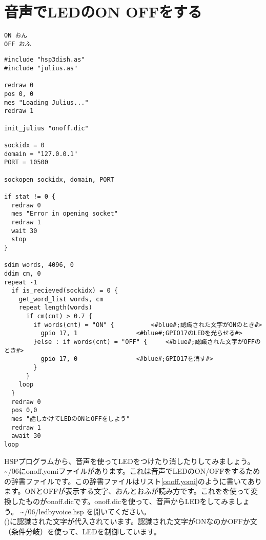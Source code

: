 \newpage
\section{音声でLEDのON OFFをする}

\begin{lstlisting}[caption=onoff.yomi,label=onoff.yomi]
ON おん
OFF おふ
\end{lstlisting}

\begin{lstlisting}[caption=ledbyvoice.hsp,label=ledbyvoice.hsp]
#include "hsp3dish.as"
#include "julius.as"

redraw 0
pos 0, 0
mes "Loading Julius..."
redraw 1

init_julius "onoff.dic"

sockidx = 0
domain = "127.0.0.1"
PORT = 10500

sockopen sockidx, domain, PORT

if stat != 0 {
  redraw 0
  mes "Error in opening socket"
  redraw 1
  wait 30
  stop
}

sdim words, 4096, 0
ddim cm, 0
repeat -1
  if is_recieved(sockidx) = 0 {
    get_word_list words, cm
    repeat length(words)
      if cm(cnt) > 0.7 {
        if words(cnt) = "ON" {			<#blue#;認識された文字がONのとき#>
          gpio 17, 1				<#blue#;GPIO17のLEDを光らせる#>
        }else : if words(cnt) = "OFF" {		<#blue#;認識された文字がOFFのとき#>
          gpio 17, 0				<#blue#;GPIO17を消す#>
        }
      }
    loop
  }
  redraw 0
  pos 0,0
  mes "話しかけてLEDのONとOFFをしよう"
  redraw 1
  await 30
loop
\end{lstlisting}

HSPプログラムから、音声を使ってLEDをつけたり消したりしてみましょう。 \textasciitilde /06にonoff.yomiファイルがあります。これは音声でLEDのON/OFFをするための辞書ファイルです。この辞書ファイルはリスト\ref{onoff.yomi}のように書いてあります。ONとOFFが表示する文字、おんとおふが読み方です。これをを使って変換したものがonoff.dicです。onoff.dicを使って、音声からLEDをしてみましょう。 \textasciitilde /06/ledbyvoice.hsp を開いてください。\\

()に認識された文字が代入されています。認識された文字がONなのかOFFか文（条件分岐）を使って、LEDを制御しています。\\

\begin{tcolorbox}[title=\useOmetoi]
\begin{enumerate}
\end{enumerate}
\end{tcolorbox}
